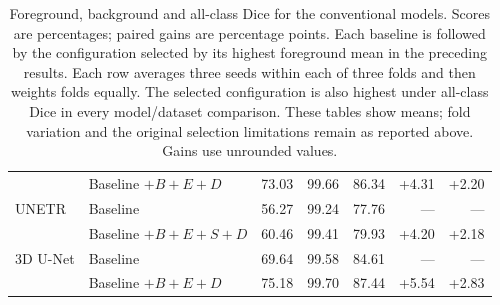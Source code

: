 \documentclass[12pt,a4paper]{article}
\begin{document}
\begin{table}[p]
\begin{tabular}{@{}llrrrrr@{}}
 & Baseline $+B+E+D$ & 73.03 & 99.66 & 86.34 & +4.31 & +2.20 \\
UNETR & Baseline & 56.27 & 99.24 & 77.76 & --- & --- \\
 & Baseline $+B+E+S+D$ & 60.46 & 99.41 & 79.93 & +4.20 & +2.18 \\
3D U-Net & Baseline & 69.64 & 99.58 & 84.61 & --- & --- \\
 & Baseline $+B+E+D$ & 75.18 & 99.70 & 87.44 & +5.54 & +2.83 \\
\hline
\end{tabular}
\caption{Foreground, background and all-class Dice for the conventional
models. Scores are percentages; paired gains are percentage points.
Each baseline is followed by the configuration selected by its highest
foreground mean in the preceding results. Each row averages three seeds
within each of three folds and then weights folds equally. The selected
configuration is also highest under all-class Dice in every model/dataset
comparison. These tables show means; fold variation and the original
selection limitations remain as reported above. Gains use unrounded values.}
\label{tab:background-conventional}
\end{table}
\FloatBarrier
\end{document}

